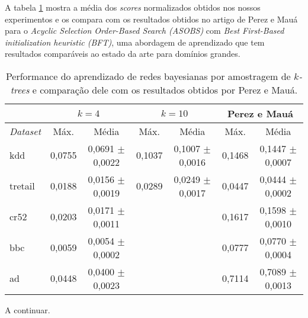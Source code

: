 A tabela \ref{tab:comparacao} mostra a média dos \emph{scores} normalizados obtidos nos nossos experimentos e os compara com os resultados obtidos no artigo de Perez e Mauá \cite{perez} para o \emph{Acyclic Selection Order-Based Search (ASOBS)} com \emph{Best First-Based initialization heuristic (BFT)}, uma abordagem de aprendizado que tem resultados comparáveis ao estado da arte para domínios grandes.

\begin{table}[h]
  \centering

  {\footnotesize
    \begin{tabular}{l c c c c c c} \hline
      & \multicolumn{2}{c}{$k = 4$} & \multicolumn{2}{c}{$k = 10$} & \multicolumn{2}{c}{Perez e Mauá} \\ \hline
      \emph{Dataset} & Máx. & Média & Máx. & Média & Máx. & Média \\ \hline
      kdd & 0,0755 & 0,0691 $\pm$ 0,0022 & 0,1037 & 0,1007 $\pm$ 0,0016 & 0,1468 & 0,1447 $\pm$ 0,0007 \\
      tretail & 0,0188 & 0,0156 $\pm$ 0,0019 & 0,0289 & 0,0249 $\pm$ 0,0017 & 0,0447 & 0,0444 $\pm$ 0,0002 \\
      cr52 & 0,0203 & 0,0171 $\pm$ 0,0011 & & & 0,1617 & 0,1598 $\pm$ 0,0010 \\
      bbc & 0,0059 & 0,0054 $\pm$ 0,0002 & & & 0,0777 & 0,0770 $\pm$ 0,0004 \\
      ad & 0,0448 & 0,0400 $\pm$ 0,0023 & & & 0,7114 & 0,7089 $\pm$ 0,0013 \\ \hline
    \end{tabular}
  }

  \caption{Performance do aprendizado de redes bayesianas por amostragem de \emph{$k$-trees} e comparação dele com os resultados obtidos por Perez e Mauá.}
  \label{tab:comparacao}
\end{table}

A continuar. %
